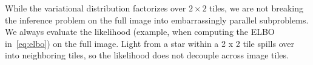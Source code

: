 While the variational distribution factorizes over $2 \times 2$ tiles, we are not breaking the inference problem on the full image into embarrassingly parallel subproblems. We always evaluate the likelihood (example, when computing the ELBO in~\eqref{eq:elbo}) on the full image. Light from a star within a 2 x 2 tile spills over into neighboring tiles, so the likelihood does not decouple across image tiles. 
